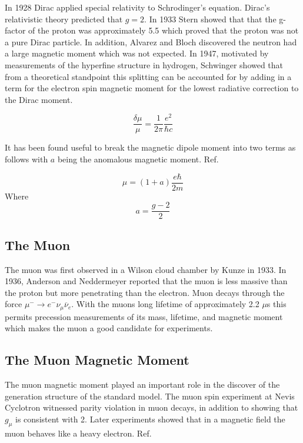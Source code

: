 \documentclass[./Thesis]{subfiles}
\begin{document}
In 1928 Dirac applied special relativity to Schrodinger's equation.  Dirac's relativistic theory predicted that $g=2$.  In 1933 Stern showed that that the g-factor of the proton was approximately 5.5 which proved that the proton was not a pure Dirac particle.\cite{Stern2}  In addition, Alvarez and Bloch discovered the neutron had a large magnetic moment which was not expected.\cite{Bloch}  In 1947, motivated by measurements of the hyperfine structure in hydrogen, Schwinger showed that from a theoretical standpoint this splitting can be accounted for by adding in a term for the electron spin magnetic moment for the lowest radiative correction to the Dirac moment.\cite{Schwinger}

	\begin{equation}
	\frac{\delta\mu}{\mu}  = \frac{1}{2 \pi } \frac{e^2}{\hbar c}
	\end{equation}
	
It has been found useful to break the magnetic dipole moment into two terms as follows with $a$ being the anomalous magnetic moment.  Ref.\cite{TDR}
	
	\begin{equation}
	\mu = (1+a)\frac{e\hbar}{2m}
	\end{equation}
	Where
	\begin{equation}
	a = \frac{g-2}{2}
	\end{equation}
	
	
\subsection{The Muon}

	The muon was first observed in a Wilson cloud chamber by Kunze in 1933.\cite{Cloud} In 1936, Anderson and Neddermeyer reported that the muon is less massive than the proton but more penetrating than the electron.\cite{Nevis} Muon decays through the force $\mu^- \rightarrow e^{-}\nu_{\mu}\overline{\nu}_{e}$. With the muons long lifetime of approximately 2.2 $\mu$s this permits precession measurements of its mass, lifetime, and magnetic moment which makes the muon a good candidate for experiments.\cite{TDR}

\subsection{The Muon Magnetic Moment}

	The muon magnetic moment played an important role in the discover of the generation structure of the standard model.  The muon spin experiment at Nevis Cyclotron witnessed parity violation in muon decays, in addition to showing that $g_\mu$ is consistent with 2.  Later experiments showed that in a magnetic field the muon behaves like a heavy electron.  Ref.\cite{TDR}
\end{document}
